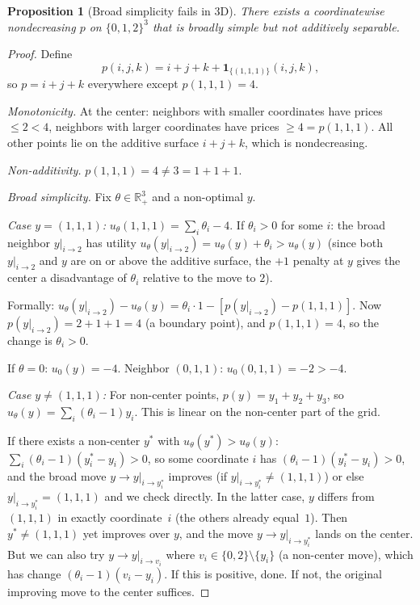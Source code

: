 \documentclass[11pt]{article}
\newtheorem{proposition}[theorem]{Proposition}
\newcommand{\R}{\mathbb{R}}
\newcommand{\Rp}{\R_+}
\newcommand{\ind}{\mathbf{1}}
\begin{document}
\begin{proposition}[Broad simplicity fails in 3D]%
\label{prop:broad-3d-fail}
There exists a coordinatewise nondecreasing $p$ on $\{0,1,2\}^3$
that is broadly simple but not additively separable.
\end{proposition}

\begin{proof}
Define
\[
  p(i,j,k) = i + j + k + \ind_{\{(1,1,1)\}}(i,j,k),
\]
so $p = i + j + k$ everywhere except $p(1,1,1) = 4$.

\emph{Monotonicity.}
At the center: neighbors with smaller coordinates have prices
$\leq 2 < 4$, neighbors with larger coordinates have prices
$\geq 4 = p(1,1,1)$.  All other points lie on the additive surface
$i + j + k$, which is nondecreasing.

\emph{Non-additivity.}
$p(1,1,1) = 4 \neq 3 = 1 + 1 + 1$.

\emph{Broad simplicity.}
Fix $\theta \in \Rp^3$ and a non-optimal $y$.

\emph{Case $y = (1,1,1)$:}
$u_\theta(1,1,1) = \sum_i \theta_i - 4$.  If $\theta_i > 0$ for some
$i$: the broad neighbor $y|_{i \to 2}$ has utility
$u_\theta(y|_{i \to 2}) = u_\theta(y) + \theta_i > u_\theta(y)$
(since both $y|_{i \to 2}$ and $y$ are on or above the additive surface,
the $+1$ penalty at $y$ gives the center a disadvantage of $\theta_i$
relative to the move to $2$).

Formally: $u_\theta(y|_{i \to 2}) - u_\theta(y) = \theta_i \cdot 1
- [p(y|_{i \to 2}) - p(1,1,1)]$.  Now $p(y|_{i \to 2}) = 2 + 1 + 1 = 4$
(a boundary point), and $p(1,1,1) = 4$, so the change is $\theta_i > 0$.

If $\theta = 0$: $u_0(y) = -4$.  Neighbor $(0,1,1)$:
$u_0(0,1,1) = -2 > -4$.

\emph{Case $y \neq (1,1,1)$:}
For non-center points, $p(y) = y_1 + y_2 + y_3$, so
$u_\theta(y) = \sum_i (\theta_i - 1) y_i$.  This is linear on the
non-center part of the grid.

If there exists a non-center $y^*$ with $u_\theta(y^*) > u_\theta(y)$:
$\sum_i (\theta_i - 1)(y^*_i - y_i) > 0$, so some coordinate $i$ has
$(\theta_i - 1)(y^*_i - y_i) > 0$, and the broad move $y \to y|_{i \to y^*_i}$
improves (if $y|_{i \to y^*_i} \neq (1,1,1)$) or else
$y|_{i \to y^*_i} = (1,1,1)$ and we check directly.  In the latter case,
$y$ differs from $(1,1,1)$ in exactly coordinate~$i$ (the others already
equal~$1$).  Then $y^* \neq (1,1,1)$ yet improves over $y$, and the move
$y \to y|_{i \to y^*_i}$ lands on the center.  But we can also try
$y \to y|_{i \to v_i}$ where $v_i \in \{0,2\} \setminus \{y_i\}$ (a
non-center move), which has change $(\theta_i - 1)(v_i - y_i)$.  If this
is positive, done.  If not, the original improving move to the center
suffices.


\end{proof}
\end{document}
